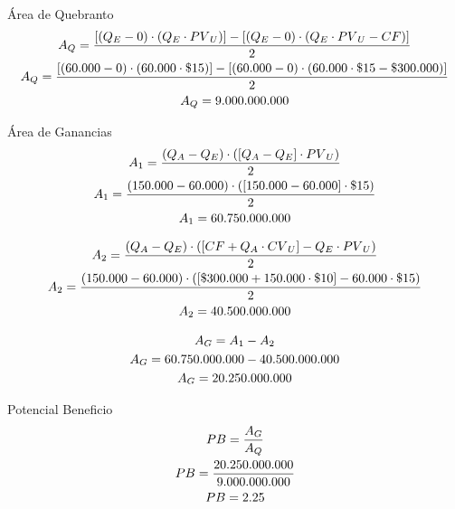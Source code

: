 \documentclass[12pt,a4paper]{article}
\begin{document}
        Área de Quebranto
        \begin{gather}
            {A}_{Q} = \dfrac{ [({Q}_{E}-0) \cdot ({Q}_{E} \cdot {PV}_{U})] - [({Q}_{E}-0) \cdot ({Q}_{E} \cdot {PV}_{U} - CF)] }{ 2 } \\
            {A}_{Q} = \dfrac{ [(60{.}000-0) \cdot (60{.}000 \cdot \$15)] - [(60{.}000-0) \cdot (60{.}000 \cdot \$15 - \$300{.}000)] }{ 2 } \notag \\
            {A}_{Q} = 9{.}000{.}000{.}000 \notag
        \end{gather}
        
        Área de Ganancias
        \begin{gather}
            {A}_{1} = \dfrac{ ({Q}_{A}-{Q}_{E}) \cdot ( [{Q}_{A}-{Q}_{E}] \cdot {PV}_{U})}{2} \\
            {A}_{1} = \dfrac{ (150{.}000-60{.}000) \cdot ( [150{.}000-60{.}000] \cdot \$15)}{2} \notag \\
            {A}_{1} = 60{.}750{.}000{.}000 \notag
        \end{gather}
        
        \begin{gather}
            {A}_{2} = \dfrac{ ({Q}_{A}-{Q}_{E}) \cdot ([CF + {Q}_{A} \cdot {CV}_{U}] - {Q}_{E} \cdot {PV}_{U}) }{ 2 } \\
            {A}_{2} = \dfrac{ (150{.}000-60{.}000) \cdot ([\$300{.}000 + 150{.}000 \cdot \$10] - 60{.}000 \cdot \$15) }{ 2 } \notag \\
            {A}_{2} = 40{.}500{.}000{.}000 \notag
        \end{gather}
        
        \begin{gather}
            {A}_{G} = {A}_{1} - {A}_{2} \\
            {A}_{G} = 60{.}750{.}000{.}000 - 40{.}500{.}000{.}000 \notag \\
            {A}_{G} = 20{.}250{.}000{.}000 \notag
        \end{gather}
        
        Potencial Beneficio
        \begin{gather}
            PB = \dfrac{ {A}_{G} }{ {A}_{Q} } \\
            PB = \dfrac{ 20{.}250{.}000{.}000 }{ 9{.}000{.}000{.}000 } \notag \\
            PB = 2.25 \notag
        \end{gather}
        

\end{document}
